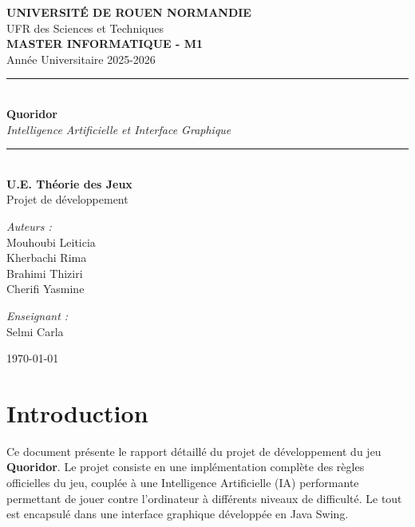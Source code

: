 \documentclass[12pt,a4paper]{article}
\begin{document}
\begin{titlepage}
    \centering
    \vspace*{1cm}
    {\Large \textbf{UNIVERSITÉ DE ROUEN NORMANDIE}} \\[0.5cm]
    {\large UFR des Sciences et Techniques} \\[2cm]
    
    {\Large \textbf{MASTER INFORMATIQUE - M1}} \\[0.5cm]
    {\large Année Universitaire 2025-2026} \\[1.5cm]
    
    \hrule \\[0.4cm]
    {\huge \textbf{Quoridor}} \\[0.2cm]
    {\large \textit{Intelligence Artificielle et Interface Graphique}} \\[0.4cm]
    \hrule \\[1.5cm]
    
    {\large \textbf{U.E. Théorie des Jeux}} \\[0.5cm]
    {\large Projet de développement} \\[2cm]
    
    \begin{minipage}{0.4\textwidth}
        \begin{flushleft} \large
            \emph{Auteurs :}\\
            Mouhoubi Leiticia\\
            Kherbachi Rima\\
            Brahimi Thiziri\\
            Cherifi Yasmine
        \end{flushleft}
        
    \end{minipage}
    \hfill
    \begin{minipage}{0.4\textwidth}
        \begin{flushright} \large
            \emph{Enseignant :}\\
           Selmi Carla
        \end{flushright}
    \end{minipage}
    
    \vfill
    {\large \today}
\end{titlepage}
\newpage
\tableofcontents
\newpage

\section{Introduction}
Ce document présente le rapport détaillé du projet de développement du jeu \textbf{Quoridor}.
Le projet consiste en une implémentation complète des règles officielles du jeu, couplée à une Intelligence Artificielle (IA) performante permettant de jouer contre l'ordinateur à différents niveaux de difficulté. Le tout est encapsulé dans une interface graphique développée en Java Swing.
\end{document}
